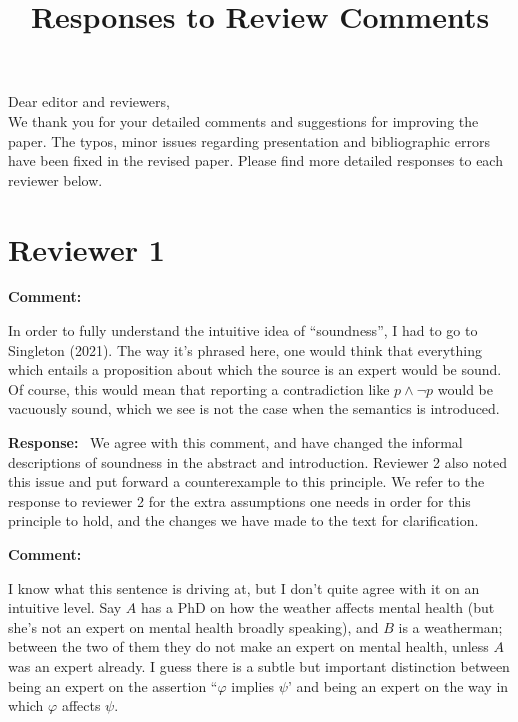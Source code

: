 \documentclass[12pt]{article}
\title{%
    Responses to Review Comments
}
\author{}
\date{}
\newenvironment{comment}{
    \noindent\textbf{Comment:}\
    \em
}{\vspace{5mm}}
\newenvironment{response}{
    \noindent\textbf{Response:}\
}{\vspace{5mm}}
\renewcommand{\phi}{\varphi}
\begin{document}
\maketitle

Dear editor and reviewers,\\

We thank you for your detailed comments and suggestions for improving the
paper. The typos, minor issues regarding presentation and bibliographic errors
have been fixed in the revised paper. Please find more detailed responses to
each reviewer below.

\section*{Reviewer 1}

\begin{comment}
    In order to fully understand the intuitive idea of ``soundness'', I had to
    go to Singleton (2021). The way it’s phrased here, one would think that
    everything which entails a proposition about which the source is an expert
    would be sound. Of course, this would mean that reporting a contradiction
    like $p \land \neg p$ would be vacuously sound, which we see is not the
    case when the semantics is introduced.
\end{comment}

\begin{response}
    We agree with this comment, and have changed the informal descriptions of
    soundness in the abstract and introduction. Reviewer 2 also noted this
    issue and put forward a counterexample to this principle. We refer to the
    response to reviewer 2 for the extra assumptions one needs in order for
    this principle to hold, and the changes we have made to the text for
    clarification.
\end{response}

\begin{comment}
    I know what this sentence is driving at, but I don’t quite agree with it on
    an intuitive level. Say $A$ has a PhD on how the weather affects mental
    health (but she's not an expert on mental health broadly speaking), and $B$
    is a weatherman; between the two of them they do not make an expert on
    mental health, unless $A$ was an expert already.  I guess there is a subtle
    but important distinction between being an expert on the assertion ``$\phi$
    implies $\psi$’ and being an expert on the way in which $\phi$ affects
    $\psi$.
\end{comment}
\end{document}
